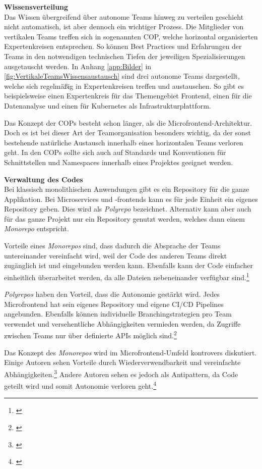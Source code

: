 \textbf{Wissensverteilung}\\
Das Wissen übergreifend über autonome Teams hinweg zu verteilen geschieht nicht automatisch, ist aber dennoch ein wichtiger Prozess. Die Mitglieder von vertikalen Teams treffen sich in sogenannten \gls{COP}, welche horizontal organisierten Expertenkreisen entsprechen. So können Best Practices und Erfahrungen der Teams in den notwendigen technischen Tiefen der jeweiligen Spezialisierungen ausgetauscht werden. In Anhang \ref{app:Bilder} in \cref{fig:VertikaleTeamsWissensaustausch} sind drei autonome Teams dargestellt, welche sich regelmäßig in Expertenkreisen treffen und austauschen. So gibt es beispielsweise einen Expertenkreis für das Themengebiet Frontend, einen für die Datenanalyse und einen für Kubernetes als Infrastrukturplattform.

Das Konzept der \gls{COP}s besteht schon länger, als die Microfrontend-Architektur. Doch es ist bei dieser Art der Teamorganisation besonders wichtig, da der sonst bestehende natürliche Austausch innerhalb eines horizontalen Teams verloren geht. In den \gls{COP}s sollte sich auch auf Standards und Konventionen für Schnittstellen und Namespaces innerhalb eines Projektes geeignet werden.

\textbf{Verwaltung des Codes}\\
Bei klassisch monolithischen Anwendungen gibt es ein Repository für die ganze Applikation. Bei Microservices und -frontends kann es für jede Einheit ein eigenes Repository geben. Dies wird als \textit{Polyrepo} bezeichnet. Alternativ kann aber auch für das ganze Projekt nur ein Repository genutzt werden, welches dann einem \textit{Monorepo} entspricht.

Vorteile eines \textit{Monorepos} sind, dass dadurch die Absprache der Teams untereinander vereinfacht wird, weil der Code des anderen Teams direkt zugänglich ist und eingebunden werden kann. Ebenfalls kann der Code einfacher einheitlich überarbeitet werden, da alle Dateien nebeneinander verfügbar sind.\footnote{\cite[vgl.][152\psqq]{Mezzalira2021}}

\textit{Polyrepos} haben den Vorteil, dass die Autonomie gestärkt wird. Jedes Microfrontend hat sein eigenes Repository und eigene \gls{CI/CD} Pipelines angebunden. Ebenfalls können individuelle Branchingstrategien pro Team verwendet und versehentliche Abhängigkeiten vermieden werden, da Zugriffe zwischen Teams nur über definierte \gls{API}s möglich sind.\footnote{\cite[vgl.][156\psqq]{Mezzalira2021}}

Das Konzept des \textit{Monorepos} wird im Microfrontend-Umfeld kontrovers diskutiert. Einige Autoren sehen Vorteile durch Wiederverwendbarkeit und vereinfachte Abhängigkeiten.\footnote{\cite[vgl.][152\psqq]{Mezzalira2021}} Andere Autoren sehen es jedoch als Antipattern, da Code geteilt wird und somit Autonomie verloren geht.\footnote{\cite[vgl.][258]{Geers2020}}

